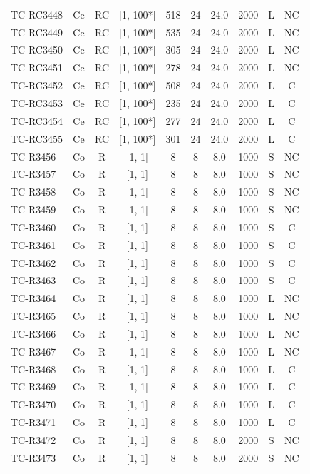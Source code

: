 \begin{longtable}{lccccccccc}
TC-RC3448 & Ce & RC & [1, 100*] & 518 & 24 & 24.0 & 2000 & L & NC \\
TC-RC3449 & Ce & RC & [1, 100*] & 535 & 24 & 24.0 & 2000 & L & NC \\
TC-RC3450 & Ce & RC & [1, 100*] & 305 & 24 & 24.0 & 2000 & L & NC \\
TC-RC3451 & Ce & RC & [1, 100*] & 278 & 24 & 24.0 & 2000 & L & NC \\
TC-RC3452 & Ce & RC & [1, 100*] & 508 & 24 & 24.0 & 2000 & L & C \\
TC-RC3453 & Ce & RC & [1, 100*] & 235 & 24 & 24.0 & 2000 & L & C \\
TC-RC3454 & Ce & RC & [1, 100*] & 277 & 24 & 24.0 & 2000 & L & C \\
TC-RC3455 & Ce & RC & [1, 100*] & 301 & 24 & 24.0 & 2000 & L & C \\
TC-R3456 & Co & R & [1, 1] & 8 & 8 & 8.0 & 1000 & S & NC \\
TC-R3457 & Co & R & [1, 1] & 8 & 8 & 8.0 & 1000 & S & NC \\
TC-R3458 & Co & R & [1, 1] & 8 & 8 & 8.0 & 1000 & S & NC \\
TC-R3459 & Co & R & [1, 1] & 8 & 8 & 8.0 & 1000 & S & NC \\
TC-R3460 & Co & R & [1, 1] & 8 & 8 & 8.0 & 1000 & S & C \\
TC-R3461 & Co & R & [1, 1] & 8 & 8 & 8.0 & 1000 & S & C \\
TC-R3462 & Co & R & [1, 1] & 8 & 8 & 8.0 & 1000 & S & C \\
TC-R3463 & Co & R & [1, 1] & 8 & 8 & 8.0 & 1000 & S & C \\
TC-R3464 & Co & R & [1, 1] & 8 & 8 & 8.0 & 1000 & L & NC \\
TC-R3465 & Co & R & [1, 1] & 8 & 8 & 8.0 & 1000 & L & NC \\
TC-R3466 & Co & R & [1, 1] & 8 & 8 & 8.0 & 1000 & L & NC \\
TC-R3467 & Co & R & [1, 1] & 8 & 8 & 8.0 & 1000 & L & NC \\
TC-R3468 & Co & R & [1, 1] & 8 & 8 & 8.0 & 1000 & L & C \\
TC-R3469 & Co & R & [1, 1] & 8 & 8 & 8.0 & 1000 & L & C \\
TC-R3470 & Co & R & [1, 1] & 8 & 8 & 8.0 & 1000 & L & C \\
TC-R3471 & Co & R & [1, 1] & 8 & 8 & 8.0 & 1000 & L & C \\
TC-R3472 & Co & R & [1, 1] & 8 & 8 & 8.0 & 2000 & S & NC \\
TC-R3473 & Co & R & [1, 1] & 8 & 8 & 8.0 & 2000 & S & NC \\

\end{longtable}

